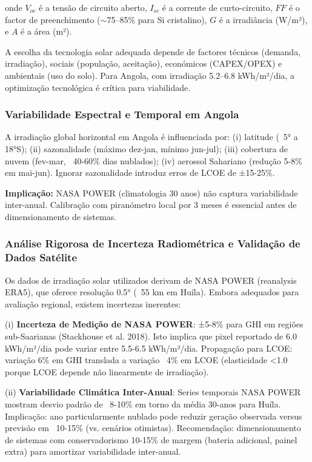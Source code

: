 \documentclass[12pt, a4paper]{article}
\begin{document}
onde $V_{oc}$ é a tensão de circuito aberto, $I_{sc}$ é a corrente de curto-circuito, $FF$ é o factor de preenchimento ($\sim$75--85\% para Si cristalino), $G$ é a irradiância (W/m²), e $A$ é a área (m²).

A escolha da tecnologia solar adequada depende de factores técnicos (demanda, irradiação), sociais (população, aceitação), económicos (CAPEX/OPEX) e ambientais (uso do solo). Para Angola, com irradiação 5.2--6.8 kWh/m²/dia, a optimização tecnológica é crítica para viabilidade.

\subsubsection{Variabilidade Espectral e Temporal em Angola}

A irradiação global horizontal em Angola é influenciada por: (i) latitude (~5° a 18°S); (ii) sazonalidade (máximo dez-jan, mínimo jun-jul); (iii) cobertura de nuvem (fev-mar, ~40-60\% dias nublados); (iv) aerossol Sahariano (redução 5-8\% em mai-jun). Ignorar sazonalidade introduz erros de LCOE de ±15-25\%.

\textbf{Implicação:} NASA POWER (climatologia 30 anos) não captura variabilidade inter-anual. Calibração com piranómetro local por 3 meses é essencial antes de dimensionamento de sistemas.

\subsubsection{Análise Rigorosa de Incerteza Radiométrica e Validação de Dados Satélite}

Os dados de irradiação solar utilizados derivam de NASA POWER (reanalysis ERA5), que oferece resolução 0.5° (~55 km em Huíla). Embora adequados para avaliação regional, existem incertezas inerentes:

(i) \textbf{Incerteza de Medição de NASA POWER}: ±5-8\% para GHI em regiões sub-Saarianas (Stackhouse et al. 2018). Isto implica que pixel reportado de 6.0 kWh/m²/dia pode variar entre 5.5-6.5 kWh/m²/dia. Propagação para LCOE: variação 6\% em GHI translada a variação ~4\% em LCOE (elasticidade <1.0 porque LCOE depende não linearmente de irradiação).

(ii) \textbf{Variabilidade Climática Inter-Anual}: Series temporais NASA POWER mostram desvio padrão de ~8-10\% em torno da média 30-anos para Huíla. Implicação: ano particularmente nublado pode reduzir geração observada versus previsão em ~10-15\% (vs. cenários otimistas). Recomendação: dimensionamento de sistemas com conservadorismo 10-15\% de margem (bateria adicional, painel extra) para amortizar variabilidade inter-anual.
\end{document}
